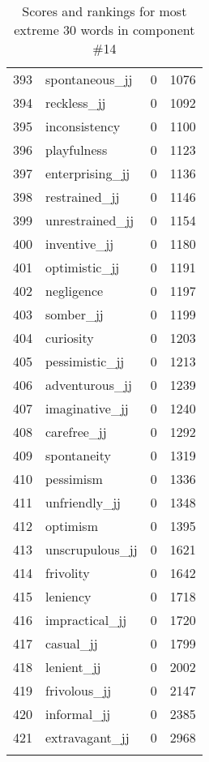 \begin{longtable}[!htbp]{| rlr@{.}l |}
    393 & spontaneous\_jj & 0 & 1076 \\
    394 & reckless\_jj & 0 & 1092 \\
    395 & inconsistency & 0 & 1100 \\
    396 & playfulness & 0 & 1123 \\
    397 & enterprising\_jj & 0 & 1136 \\
    398 & restrained\_jj & 0 & 1146 \\
    399 & unrestrained\_jj & 0 & 1154 \\
    400 & inventive\_jj & 0 & 1180 \\
    401 & optimistic\_jj & 0 & 1191 \\
    402 & negligence & 0 & 1197 \\
    403 & somber\_jj & 0 & 1199 \\
    404 & curiosity & 0 & 1203 \\
    405 & pessimistic\_jj & 0 & 1213 \\
    406 & adventurous\_jj & 0 & 1239 \\
    407 & imaginative\_jj & 0 & 1240 \\
    408 & carefree\_jj & 0 & 1292 \\
    409 & spontaneity & 0 & 1319 \\
    410 & pessimism & 0 & 1336 \\
    411 & unfriendly\_jj & 0 & 1348 \\
    412 & optimism & 0 & 1395 \\
    413 & unscrupulous\_jj & 0 & 1621 \\
    414 & frivolity & 0 & 1642 \\
    415 & leniency & 0 & 1718 \\
    416 & impractical\_jj & 0 & 1720 \\
    417 & casual\_jj & 0 & 1799 \\
    418 & lenient\_jj & 0 & 2002 \\
    419 & frivolous\_jj & 0 & 2147 \\
    420 & informal\_jj & 0 & 2385 \\
    421 & extravagant\_jj & 0 & 2968 \\
    \hline
    \caption{Scores and rankings for most extreme 30 words in component \#14} \\
\end{longtable}
